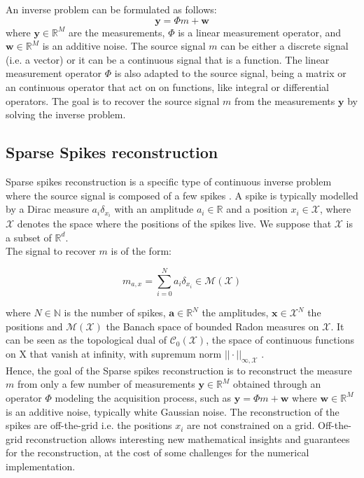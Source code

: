 \documentclass[a4paper,12pt,oneside]{report}
\theoremstyle{named}
\begin{document}
An inverse problem can be formulated as follows:
\begin{equation}
    \mathbf{y} = \Phi m + \mathbf{w}
\end{equation}
where $\mathbf{y} \in \mathbb{R}^M$ are the measurements, $\Phi$ is a linear measurement operator, and $\mathbf{w} \in \mathbb{R}^M$ is an additive noise. The source signal $m$ can be either a discrete signal (i.e. a vector) or it can be a continuous signal that is a function. The linear measurement operator $\Phi$ is also adapted to the source signal, being a matrix or an continuous operator that act on on functions, like integral or differential operators. The goal is to recover the source signal $m$ from the measurements $\mathbf{y}$ by solving the inverse problem.

\subsection{Sparse Spikes reconstruction} \label{ssr}
Sparse spikes reconstruction is a specific type of continuous inverse problem where the source signal is composed of a few spikes \cite{jimaging7120266}. A spike is typically modelled by a Dirac measure $a_i \delta_{x_i}$ with an amplitude $a_i \in \mathbb{R}$ and a position $x_i \in \mathcal{X}$, where $\mathcal{X}$ denotes the space where the positions of the spikes live. We suppose that $\mathcal{X}$ is a subset of $\mathbb{R}^d$. \\

The signal to recover $m$ is of the form:

\begin{equation}
    m_{a, x} = \sum_{i = 0}^{N} a_i \delta_{x_i} \in \mathcal{M}(\mathcal{X})
\end{equation}

where $N \in \mathbb{N}$ is the number of spikes, $\mathbf{a} \in \mathbb{R}^N$ the amplitudes, $\mathbf{x} \in \mathcal{X}^N$ the positions and $\mathcal{M}(\mathcal{X})$ the Banach space of bounded Radon measures on $\mathcal{X}$. It can be seen as the topological dual of $\mathcal{C}_0(\mathcal{X})$, the space of continuous functions on X that vanish at infinity, with supremum norm $||\cdot||_{\infty, \mathcal{X}}$ \cite{Federer1996}.\\

Hence, the goal of the Sparse spikes reconstruction is to reconstruct the measure $m$ from only a few number of measurements $\mathbf{y} \in \mathbb{R}^M$ obtained through an operator $\Phi$ modeling the acquisition process, such as $\mathbf{y} = \Phi m + \mathbf{w}$ where $\mathbf{w} \in \mathbb{R}^M$ is an additive noise, typically white Gaussian noise. The reconstruction of the spikes are off-the-grid i.e. the positions $x_i$ are not constrained on a grid. Off-the-grid reconstruction allows interesting new mathematical insights and guarantees for the reconstruction, at the cost of some challenges for the numerical implementation.
\end{document}
